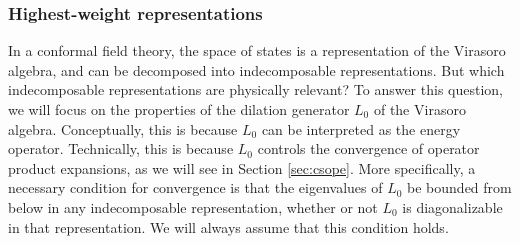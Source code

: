 \documentclass[12pt, a4paper]{article}
\begin{document}
\subsubsection{Highest-weight representations}\label{sec:hwr}

In a conformal field theory, the space of states is a representation of the Virasoro algebra, and can be decomposed into indecomposable representations. But which indecomposable representations are physically relevant? To answer this question, we will focus on the properties of the dilation generator $L_0$ of the Virasoro algebra. Conceptually, this is because $L_0$ can be interpreted as the energy operator. Technically, this is because $L_0$ controls the convergence of operator product expansions, as we will see in Section \ref{sec:csope}. More specifically, a necessary condition for convergence is that the eigenvalues of $L_0$ be bounded from below in any indecomposable representation, whether or not $L_0$ is diagonalizable in that representation. We will always assume that this condition holds.
\end{document}
